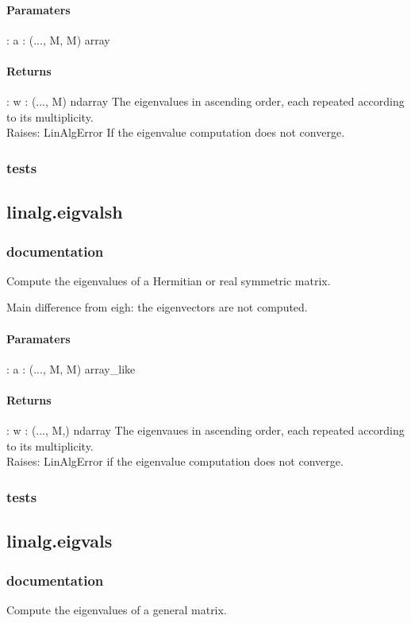 \paragraph{Paramaters}: 
a : (..., M, M) array\\
\paragraph{Returns}:    
w : (..., M) ndarray
The eigenvalues in ascending order, each repeated according to its multiplicity.\\
Raises: 
LinAlgError
If the eigenvalue computation does not converge.\\



\subsubsection{tests}
\subsection{linalg.eigvalsh}
\subsubsection{documentation}
Compute the eigenvalues of a Hermitian or real symmetric matrix.

Main difference from eigh: the eigenvectors are not computed.
\paragraph{Paramaters}: 
a : (..., M, M) array\_like\\
\paragraph{Returns}:    
w : (..., M,) ndarray
The eigenvaues in ascending order, each repeated according to its multiplicity.\\
Raises: 
LinAlgError if the eigenvalue computation does not converge.

\subsubsection{tests}
\subsection{linalg.eigvals}
\subsubsection{documentation}
Compute the eigenvalues of a general matrix.

